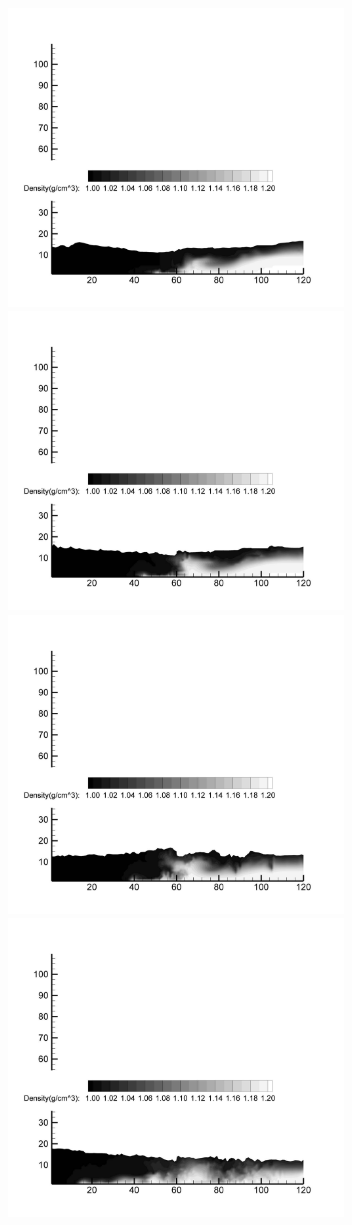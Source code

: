 \begin{figure}[h]
\begin{center}
\includegraphics[width=3.5in]{../figures/SRM/SRM-DDM-100.pdf}
\includegraphics[width=3.5in]{../figures/SRM/SRM-DDM-125.pdf}
\includegraphics[width=3.5in]{../figures/SRM/SRM-DDM-150.pdf}
\includegraphics[width=3.5in]{../figures/SRM/SRM-DDM-200.pdf}

\end{center}
\end{figure}
